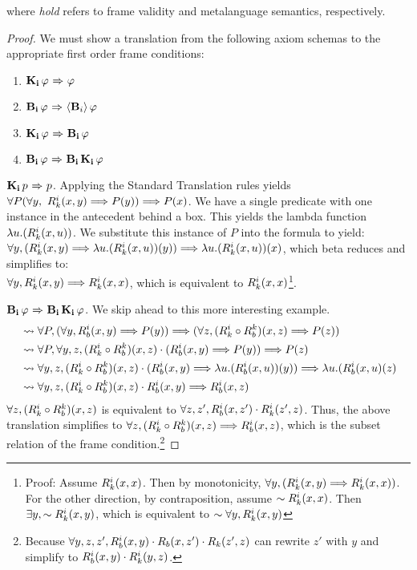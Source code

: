 where \emph{hold} refers to frame validity and metalanguage semantics, respectively.
\begin{proof} We must show a translation from the following axiom schemas to the appropriate first order frame conditions:
	\begin{enumerate}
		\item $\mathbf{K}_{\mathbf{i}}\,\varphi {\ \Rightarrow \ } \varphi$
		\item $\mathbf{B}_{\mathbf{i}}\,\varphi {\ \Rightarrow \ } \langle \mathbf{B}_{i} \rangle\,\varphi$
		\item $\mathbf{K}_{\mathbf{i}}\,\varphi {\ \Rightarrow \ } \mathbf{B}_{\mathbf{i}}\,\varphi$
		\item $\mathbf{B}_{\mathbf{i}}\,\varphi {\ \Rightarrow \ } \mathbf{B}_{\mathbf{i}}\,\mathbf{K}_{\mathbf{i}}\,\varphi$
	\end{enumerate}

	$\mathbf{K}_{\mathbf{i}}\,p {\ \Rightarrow \ } p$. Applying the Standard Translation rules yields $\forall P(\forall y,\ R_{k}^i(x,y) \Longrightarrow P(y)) \Longrightarrow P(x)$. We have a single predicate with one instance in the antecedent behind a box. This yields the lambda function $\lambda u.(R_{k}^i(x,u))$. We substitute this instance of $P$ into the formula to yield:\\
	$\forall y, (R_{k}^i(x,y)\Longrightarrow \lambda u.(R_{k}^i(x,u))(y))\Longrightarrow \lambda u.(R_{k}^i(x,u))(x)$, which beta reduces and simplifies to:\\
	$\forall y, R_{k}^i(x,y)\Longrightarrow R_{k}^i(x,x)$, which is equivalent to $R_{k}^i(x,x)$\footnote{Proof: Assume $R_{k}^i(x,x)$. Then by monotonicity, $\forall y,(R_{k}^i(x,y) \Longrightarrow R_{k}^i(x,x))$. For the other direction, by contraposition, assume $\sim R_{k}^i(x,x)$. Then $\exists y, \sim R_{k}^i(x,y)$, which is equivalent to $\sim \forall y, R_{k}^i(x, y)$}.
	
	$\mathbf{B}_{\mathbf{i}}\,\varphi {\ \Rightarrow \ } \mathbf{B}_{\mathbf{i}}\,\mathbf{K}_{\mathbf{i}}\,\varphi$. We skip ahead to this more interesting example.
	\begin{align*}
		&\rightsquigarrow \forall P,(\forall y,R_{b}^i(x,y)\Longrightarrow P(y)) \Longrightarrow (\forall z, (R_{k}^i \circ R_{b}^k )(x,z) \Longrightarrow P(z)) \\
		&\rightsquigarrow \forall P,\forall y,z, (R_{k}^i \circ R_{b}^k )(x,z)\cdot(R_{b}^i(x,y)\Longrightarrow P(y)) \Longrightarrow P(z)\\
		&\rightsquigarrow \forall y,z, (R_{k}^i \circ R_{b}^k )(x,z)\cdot(R_{b}^i(x,y)\Longrightarrow \lambda u. (R_{b}^i(x,u))(y)) \Longrightarrow \lambda u.(R_{b}^i(x,u)(z)\\
		&\rightsquigarrow \forall y,z, (R_{k}^i \circ R_{b}^k )(x,z)\cdot R_{b}^i(x,y)\Longrightarrow R_{b}^i(x,z)
	\end{align*}	
	$\forall z,(R_{k}^i \circ R_{b}^k )(x,z)$ is equivalent to $\forall z,z', R_{b}^i(x,z') \cdot R_{k}^i(z',z)$. 
	Thus, the above translation simplifies to
	$\forall z, (R_{k}^i \circ R_{b}^k )(x,z) \Longrightarrow R_{b}^i(x,z)$, which is the subset relation of the frame condition.\footnote{Because $\forall y,z,z', R_{b}^i(x,y)\cdot R_{b}(x,z')\cdot R_{k}(z',z)$ can rewrite $z'$ with $y$ and simplify to $R_{b}^i(x,y)\cdot R_{k}^i(y,z)$.}
	

\end{proof}
